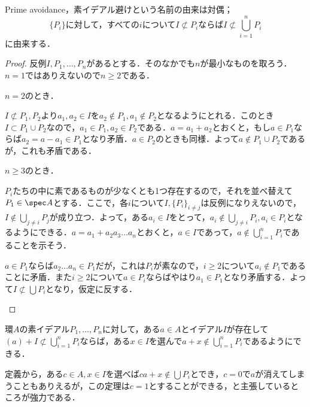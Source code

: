 Prime avoidance，素イデアル避けという名前の由来は対偶；
\[\{P_i\}\text{に対して，すべての}i\text{について}I\not\subset P_i\text{ならば}I\not\subset\bigcup_{i=1}^n P_i\]
に由来する．
\begin{proof}
	反例$I,P_1,\dots, P_n$があるとする．そのなかでも$n$が最小なものを取ろう．$n=1$ではありえないので$n\geq 2$である．
	
	\begin{sakura}
		\item $n=2$のとき．
		
		$I\not\subset P_1,P_2$より$a_1,a_2\in I$を$a_2\not\in P_1,a_1\not\in P_2$となるようにとれる．このとき$I\subset P_1\cup P_2$なので，$a_1\in P_1,a_2\in P_2$である．$a=a_1+a_2$とおくと，もし$a\in P_1$ならば$a_2=a-a_1\in P_1$となり矛盾．$a\in P_2$のときも同様．よって$a\not\in P_1\cup P_2$であるが，これも矛盾である．
		
		\item $n\geq3$のとき．
		
		$P_i$たちの中に素であるものが少なくとも1つ存在するので，それを並べ替えて$P_1\in\spec A$とする．ここで，各$i$について$I,\{P_i\}_{i\neq j}$は反例になりえないので，$I\not\in\bigcup_{j\neq i}P_j$が成り立つ．よって，ある$a_i\in I$をとって，$a_i\not\in\bigcup_{j\neq i}P_i,a_i\in P_i$となるようにできる．$a=a_1+a_2a_3\dots a_n$とおくと，$a\in I$であって，$a\not\in\bigcup_{i=1}^n P_i$であることを示そう．
		
		$a\in P_1$ならば$a_2\dots a_n\in P_1$だが，これは$P_i$が素なので，$i\geq2$について$a_i\not\in P_1$であることに矛盾．また$i\geq2$について$a\in P_i$ならばやはり$a_1\in P_1$となり矛盾する．よって$I\not\subset\bigcup P_i$となり，仮定に反する．
	\end{sakura}
\end{proof}

\begin{thm}[Davisの補題]\label{thm:Davisの補題}
	環$A$の素イデアル$P_1,\dots,P_n$に対して，ある$a\in A$とイデアル$I$が存在して$(a)+I\not\subset\bigcup_{i=1}^n P_i$ならば，ある$x\in I$を選んで$a+x\not\in\bigcup_{i=1}^n P_i$であるようにできる．
\end{thm}

定義から，ある$c\in A,x\in I$を選べば$ca+x\not\in\bigcup P_i$とでき，$c=0$で$a$が消えてしまうこともありえるが，この定理は$c=1$とすることができる，と主張しているところが強力である．

